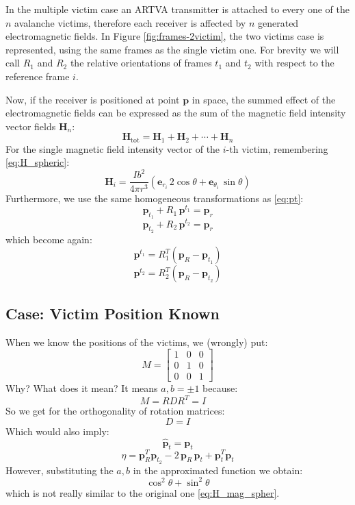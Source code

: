 In the multiple victim case an ARTVA transmitter is attached to every one of the \( n \) avalanche victims, therefore each receiver is affected by \( n \) generated electromagnetic fields.
In Figure \ref{fig:frames-2victim}, the two victims case is represented, using the same frames as the single victim one. For brevity we will call \( R_1 \) and \( R_2 \) the relative orientations of frames \( t_1 \) and \( t_2 \) with respect to the reference frame \(i\).

Now, if the receiver is positioned at point \( \mathbf{p} \) in space, the summed effect of the electromagnetic fields can be expressed as the sum of the magnetic field intensity vector fields \(\mathbf{H}_n\):
\[
\mathbf{H}_{\text{tot}} = 
\mathbf{H}_1 + \mathbf{H}_2 + \cdots + \mathbf{H}_n
\]
For the single magnetic field intensity vector of the \(i\)-th victim, remembering \ref{eq:H_spheric}:
\[
\mathbf{H}_i = \frac{I b^2}{4\pi r^3} \left( \mathbf{e}_{r_i} \, 2 \cos \theta + \mathbf{e}_{\theta_i} \, \sin \theta \right)
\]
Furthermore, we use the same homogeneous transformations as \ref{eq:pt}:
\[
\mathbf{p}_{t_1} + R_1 \, \mathbf{p}^{t_1} = \mathbf{p}_r
\]
\[
\mathbf{p}_{t_2} + R_2 \, \mathbf{p}^{t_2} = \mathbf{p}_r
\]
which become again:
\[
\mathbf{p}^{t_1} = R_1^T \left( \mathbf{p}_R - \mathbf{p}_{t_1} \right)
\]
\[
\mathbf{p}^{t_2} = R_2^T \left( \mathbf{p}_R - \mathbf{p}_{t_2} \right)
\]

\subsection{Case: Victim Position Known}

When we know the positions of the victims, we (wrongly) put:
\[
M = \begin{bmatrix}
1 & 0 & 0 \\
0 & 1 & 0 \\
0 & 0 & 1 
\end{bmatrix}
\]
Why? What does it mean?
It means \( a, b = \pm 1 \) because:
\[
M = R D R^T = I \quad
\]
So we get for the orthogonality of rotation matrices:
\[
D = I 
\]
Which would also imply:
\[
\hat{\mathbf{p}}_t = \mathbf{p}_t
\]
\[
\eta = \mathbf{p}_R^T \mathbf{p}_{t_2} - 2 \, \mathbf{p}_R \, \mathbf{p}_t + \mathbf{p}_t^T \mathbf{p}_t
\]
However, substituting the \(a, b\) in the approximated function we obtain:
\[
\cos^2 \theta + \sin^2 \theta
\]
which is not really similar to the original one \ref{eq:H_mag_spher}. 

